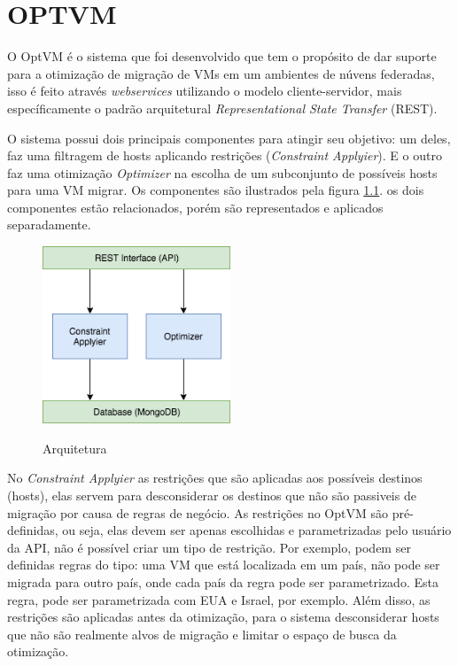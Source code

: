 \chapter{OPTVM}

O OptVM é o sistema que foi desenvolvido que tem o propósito de dar suporte para a otimização de migração de VMs em um ambientes 
de núvens federadas, isso é feito através \textit{webservices} utilizando o modelo cliente-servidor, 
mais específicamente o padrão arquitetural \textit{Representational State Transfer} (REST).

O sistema possui dois principais componentes para atingir seu objetivo: um deles, faz uma filtragem de hosts aplicando 
restrições (\textit{Constraint Applyier}). E o outro faz uma otimização \textit{Optimizer} na escolha de um 
subconjunto de possíveis hosts para uma VM migrar. Os componentes são ilustrados pela figura \ref{fig:architecture}.
os dois componentes estão relacionados, porém são representados e aplicados separadamente. 

\begin{figure}[!htb]
  \centering
  \caption{Arquitetura}
  \includegraphics[width=0.5\textwidth]{./dados/figuras/architecture}
  \label{fig:architecture}
\end{figure}

No \textit{Constraint Applyier} as restrições que são aplicadas aos possíveis destinos (hosts), elas servem para desconsiderar os destinos 
que não são passiveis de migração por causa de regras de negócio. As restrições no 
OptVM são pré-definidas, ou seja, elas devem ser apenas escolhidas e parametrizadas pelo 
usuário da API, não é possível criar um tipo de restrição. Por exemplo, podem ser definidas regras do tipo: 
uma VM que está localizada em um país, não pode ser migrada para outro país, onde cada país
da regra pode ser parametrizado. Esta regra, pode ser parametrizada com EUA e Israel, por exemplo.
Além disso, as restrições são aplicadas antes da otimização, para o sistema desconsiderar hosts que
não são realmente alvos de migração e limitar o espaço de busca da otimização.

